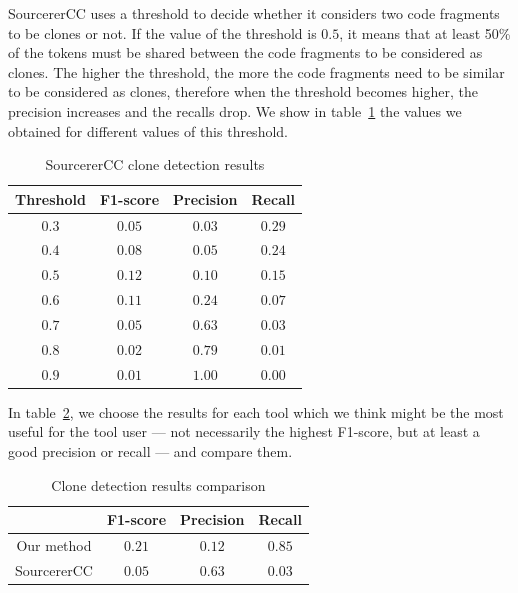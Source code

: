 SourcererCC uses a threshold to decide whether it considers two code fragments
to be clones or not. If the value of the threshold is $0.5$, it means that at
least 50\% of the tokens must be shared between the code fragments to be
considered as clones. The higher the threshold, the more the code fragments need
to be similar to be considered as clones, therefore when the threshold becomes
higher, the precision increases and the recalls drop. We show in
table~\ref{tab:sourcerer-cc-results} the values we obtained for different values
of this threshold.

\begin{table}
  \caption{\label{tab:sourcerer-cc-results}SourcererCC clone detection results}
  \begin{center}
    \begin{tabular}{c c c c}
      \toprule
      Threshold & F1-score & Precision & Recall\\
      \toprule
      $0.3$ & $0.05$ & $0.03$ & $0.29$\\
      $0.4$ & $0.08$ & $0.05$ & $0.24$\\
      \rowcolor{verylightgray} $0.5$ & $0.12$ & $0.10$ & $0.15$\\
      $0.6$ & $0.11$ & $0.24$ & $0.07$\\
      $0.7$ & $0.05$ & $0.63$ & $0.03$\\
      $0.8$ & $0.02$ & $0.79$ & $0.01$\\
      $0.9$ & $0.01$ & $1.00$ & $0.00$\\
      \bottomrule
    \end{tabular}
  \end{center}
\end{table}

In table~\ref{tab:clone-detection-full-results}, we choose the results for each
tool which we think might be the most useful for the tool user --- not
necessarily the highest F1-score, but at least a good precision or recall ---
and compare them.

\begin{table}
  \caption{\label{tab:clone-detection-full-results}Clone detection results comparison}
  \begin{center}
    \begin{tabular}{c c c c}
      \toprule
       & F1-score & Precision & Recall\\
      \toprule
      Our method & $0.21$ & $0.12$ & $0.85$\\
      SourcererCC & $0.05$ & $0.63$ & $0.03$\\
      \bottomrule
    \end{tabular}
  \end{center}
\end{table}

